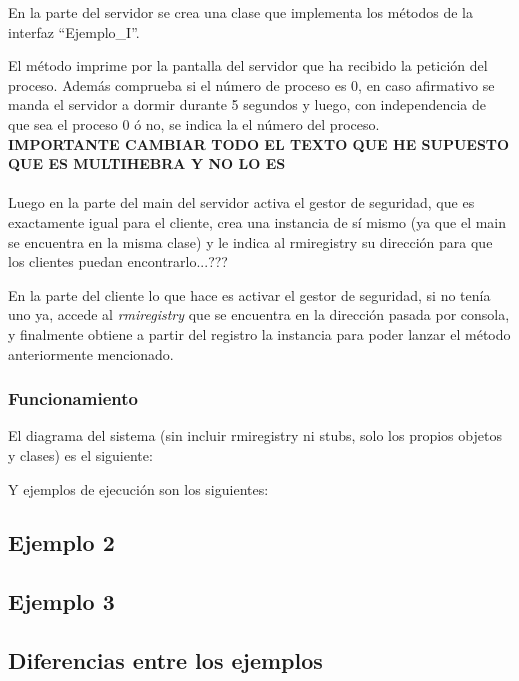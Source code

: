 \documentclass{article}
\begin{document}
En la parte del servidor se crea una clase que implementa los métodos de la interfaz ``Ejemplo\_I''.

El método imprime por la pantalla del servidor que ha recibido la petición del proceso. Además comprueba si el número de proceso es 0, en caso afirmativo se manda el servidor a dormir durante 5 segundos y luego, con independencia de que sea el proceso 0 ó no, se indica la el número del proceso.
\\

\textbf{IMPORTANTE CAMBIAR TODO EL TEXTO QUE HE SUPUESTO QUE ES MULTIHEBRA Y NO LO ES}
\\\\
Luego en la parte del main del servidor activa el gestor de seguridad, que es exactamente igual para el cliente, crea una instancia de sí mismo (ya que el main se encuentra en la misma clase) y le indica al rmiregistry su dirección para que los clientes puedan encontrarlo...???

En la parte del cliente lo que hace es activar el gestor de seguridad, si no tenía uno ya, accede al \textit{rmiregistry} que se encuentra en la dirección pasada por consola, y finalmente obtiene a partir del registro la instancia para poder lanzar el método anteriormente mencionado.


\subsubsection{Funcionamiento}
El diagrama del sistema (sin incluir rmiregistry ni stubs, solo los propios objetos y clases) es el siguiente:

Y ejemplos de ejecución son los siguientes:



\subsection{Ejemplo 2}

\subsection{Ejemplo 3}

\subsection{Diferencias entre los ejemplos}
\end{document}
